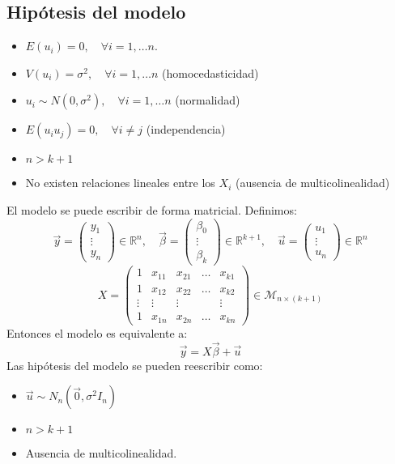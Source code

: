 \documentclass{report}
\theoremstyle{remark}
\theoremstyle{remark}
\theoremstyle{remark}
\theoremstyle{definition}
\theoremstyle{definition}
\theoremstyle{definition}
\begin{document}
\subsection*{Hipótesis del modelo}
\begin{itemize}
    \item $E(u_i) = 0, \quad \forall i = 1, \dots n$.
    \item $V(u_i) = \sigma^2, \quad \forall i = 1, \dots n$ (homocedasticidad)
    \item $u_i \sim N(0, \sigma^2), \quad \forall i = 1, \dots n$ (normalidad)
    \item $E(u_i u_j) = 0, \quad \forall i \neq j$ (independencia)
    \item $n > k+1$
    \item No existen relaciones lineales entre los $X_i$ (ausencia de multicolinealidad)
\end{itemize}
El modelo se puede escribir de forma matricial.
Definimos:
$$\vec{y} = \begin{pmatrix}
        y_1 \\ \vdots \\ y_n
    \end{pmatrix} \in \mathbb{R}^n, \quad
    \vec{\beta} = \begin{pmatrix}
        \beta_0 \\ \vdots \\ \beta_k
    \end{pmatrix} \in \mathbb{R}^{k+1}, \quad
    \vec{u} = \begin{pmatrix}
        u_1 \\ \vdots \\ u_n
    \end{pmatrix} \in \mathbb{R}^n$$
$$X = \begin{pmatrix}
        1      & x_{11} & x_{21} & \dots & x_{k1} \\
        1      & x_{12} & x_{22} & \dots & x_{k2} \\
        \vdots & \vdots & \vdots &       & \vdots \\
        1      & x_{1n} & x_{2n} & \dots & x_{kn}
    \end{pmatrix} \in \mathcal{M}_{n \times (k+1)}$$
Entonces el modelo es equivalente a:
$$\vec{y} = X\vec{\beta} + \vec{u}$$
Las hipótesis del modelo se pueden reescribir como:
\begin{itemize}
    \item $\vec{u} \sim N_n(\vec{0}, \sigma^2 I_n)$
    \item $n > k+1$
    \item Ausencia de multicolinealidad.
\end{itemize}
\end{document}
